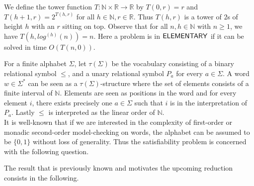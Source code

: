 \documentclass[a4paper,UKenglish,cleveref, autoref, thm-restate]{lipics-v2021}
\newcommand{\problemx}[3]{
	\vspace{0.2cm}
\par\noindent\underline{\sc#1}\par\nobreak\vskip.2\baselineskip
\begingroup\clubpenalty10000\widowpenalty10000
\setbox0\hbox{\bf INPUT:\ }\setbox1\hbox{\bf QUESTION:\ }
\dimen0=\wd0\ifnum\wd1>\dimen0\dimen0=\wd1\fi
\vskip-\parskip\noindent
\hbox to\dimen0{\box0\hfil}\hangindent\dimen0\hangafter1\ignorespaces#2\par
\vskip-\parskip\noindent
\hbox to\dimen0{\box1\hfil}\hangindent\dimen0\hangafter1\ignorespaces#3\par
\endgroup
	\vspace{-0.2cm}
}
\renewcommand{\R}{\mathbb{R}}
\newcommand{\N}{\mathbb{N}}
\begin{document}
{%

We define the tower function $T : \N \times \R \to \R$ by $T(0,r) =r$ and
$T(h+1,r)= 2^{T(h,r)}$ for all $h \in \N, r \in \R$. Thus $T(h,r)$ is a tower of $2$s of height $h$ with an $r$ sitting on top.
Observe that for all $n,h \in \N$ with $n\geq 1$, we have
$T(h, log^{(h)}(n)) = n$.
%
% 
Here a problem is in ${\sf ELEMENTARY}$ if it can be solved in time $O ( T(n, 0) )$.

For a finite alphabet $\Sigma$,  let $\tau (\Sigma )$ be the vocabulary consisting of a binary relational symbol $\leq$,  and a unary relational symbol $P_a$ for every $a \in \Sigma$. 
A word $w \in \Sigma^*$ can be seen as a $\tau (\Sigma )$-structure where the set of elements consists of a finite interval of $\N$. Elements are seen as positions in the word and for every element $i$, there exists precisely one $a \in \Sigma$ such that $i$ is in the interpretation of $P_a$. Lastly $\leq$ is interpreted as the linear order of $\N$.\\


It is well-known that if we are interested in the complexity of first-order or monadic
second-order model-checking on words, the alphabet can be assumed to be $\{0,1\}$ without loss of generality.
Thus the satisfiability problem is concerned with the following question.



The result that is previously known and motivates the upcoming reduction consists in the following.


\begin{theorem}\label{FOnonelementary}




\end{theorem}}
\end{document}
